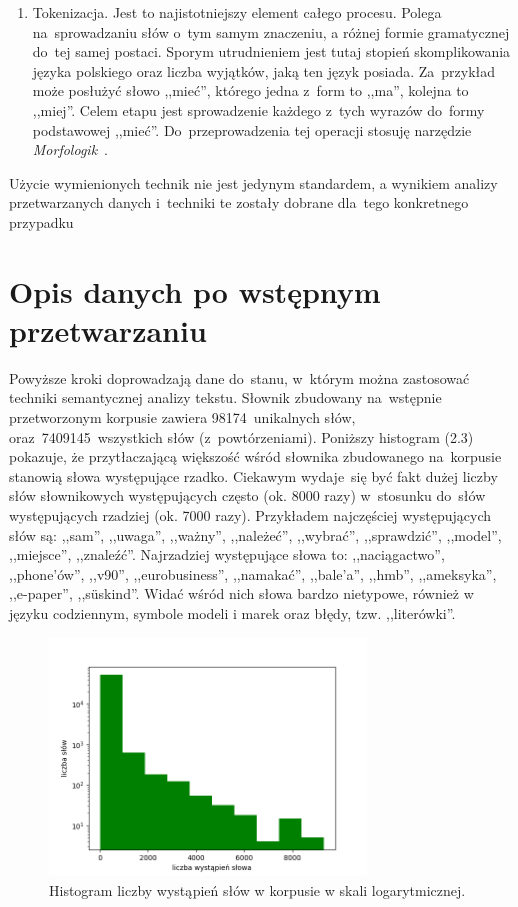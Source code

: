 \documentclass[pl]{minipw} %
\begin{document}
\begin{enumerate}
\item Tokenizacja. Jest to najistotniejszy element całego procesu. Polega na~sprowadzaniu słów o~tym samym znaczeniu, a różnej formie gramatycznej do~tej samej postaci. Sporym utrudnieniem jest tutaj stopień skomplikowania języka polskiego oraz liczba wyjątków, jaką ten język posiada. Za~przykład może posłużyć słowo ,,mieć'', którego jedna z~form to ,,ma'', kolejna to ,,miej''. Celem etapu jest sprowadzenie każdego z~tych wyrazów do~formy podstawowej ,,mieć''. Do~przeprowadzenia tej operacji stosuję narzędzie \textit{Morfologik}~\cite{morfologik}.
\end{enumerate}

Użycie wymienionych technik nie jest jedynym standardem, a wynikiem analizy przetwarzanych danych i~techniki te zostały dobrane dla~tego konkretnego przypadku

\section{Opis danych po wstępnym przetwarzaniu}

Powyższe kroki doprowadzają dane do~stanu, w~którym można zastosować techniki semantycznej analizy tekstu. Słownik zbudowany na~wstępnie przetworzonym korpusie zawiera 98174~unikalnych słów, oraz~7409145~wszystkich słów (z~powtórzeniami). Poniższy histogram (2.3) pokazuje, że przytłaczającą większość wśród słownika zbudowanego na~korpusie stanowią słowa występujące rzadko. Ciekawym wydaje~się być fakt dużej liczby słów słownikowych występujących często (ok. 8000 razy) w~stosunku do~słów występujących rzadziej (ok. 7000 razy). Przykładem najczęściej występujących słów są: ,,sam'', ,,uwaga'', ,,ważny'', ,,należeć'', ,,wybrać'', ,,sprawdzić'', ,,model'', ,,miejsce'', ,,znaleźć''. Najrzadziej występujące słowa to: ,,naciągactwo'', ,,phone’ów'', ,,v90'', ,,eurobusiness'', ,,namakać'', ,,bale’a'', ,,hmb'', ,,ameksyka'', ,,e-paper'', ,,süskind''. Widać wśród nich słowa bardzo nietypowe, również w języku codziennym, symbole modeli i marek oraz błędy, tzw. ,,literówki''.

\begin{figure}[H]
	\centering
	\includegraphics[width=0.75\textwidth]{img/words_hist_log.png}
	\caption{Histogram liczby wystąpień słów w korpusie w skali logarytmicznej.}
\end{figure}
\end{document}
